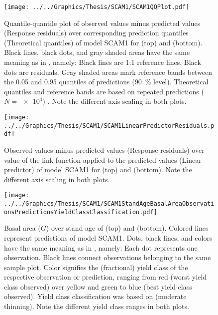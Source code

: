 \begin{figure}[h]
  \centering
  \texttt{[image: ../../Graphics/Thesis/SCAM1/SCAM1QQPlot.pdf]}
  \caption{Quantile-quantile plot of observed values minus predicted values (Response residuals) over corresponding prediction quantiles (Theoretical quantiles) of model SCAM1 for \Beech{} (top) and \Spruce{} (bottom).  Black lines, black dots, and gray shaded areas have the same meaning as in , namely:  Black lines are 1:1 reference lines.  Black dots are residuals.  Gray shaded areas mark reference bands between the \num{0.05} and \num{0.95} quantiles of predictions (\SI{90}{\percent} level).  Theoretical quantiles and reference bands are based on repeated predictions (\(N = \num{e4}\)) \parencite{Augustin2012}.  Note the different axis scaling in both plots.}
  \label{fig:SCAM1QQPlot}
\end{figure}

\begin{figure}[h]
  \centering
  \texttt{[image: ../../Graphics/Thesis/SCAM1/SCAM1LinearPredictorResiduals.pdf]}
  \caption{Observed values minus predicted values (Response residuals) over value of the link function applied to the predicted values (Linear predictor) of model SCAM1 for \Beech{} (top) and \Spruce{} (bottom).  Note the different axis scaling in both plots.}
  \label{fig:SCAM1LinearPredictorResiduals}
\end{figure}

\begin{figure}[h]
  \centering
  \texttt{[image: ../../Graphics/Thesis/SCAM1/SCAM1StandAgeBasalAreaObservationsPredictionsYieldClassClassification.pdf]}
  \caption{Basal area (\(G\)) over stand age of \Beech{} (top) and \Spruce{} (bottom).  Colored lines represent predictions of model SCAM1.  Dots, black lines, and colors have the same meaning as in , namely:  Each dot represents one observation.  Black lines connect observations belonging to the same sample plot.  Color signifies the (fractional) yield class of the respective observation or prediction, ranging from red (worst yield class observed) over yellow and green to blue (best yield class observed). Yield class classification was based on \textcite{Schober1995} (moderate thinning).  Note the different yield class ranges in both plots.}
  \label{fig:SCAM1StandAgeBasalAreaObservationsPredictionsYieldClassClassification}
\end{figure}

